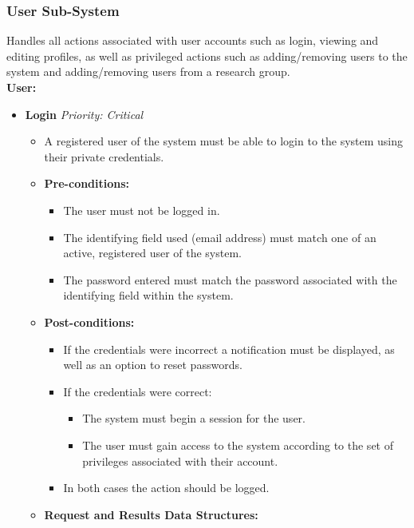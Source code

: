 \documentclass{article}
\begin{document}
			\subsubsection{User Sub-System}\label{subsubsec:user}
				Handles all actions associated with user accounts such as login, viewing and editing profiles, as well as privileged actions such as adding/removing users to the system and adding/removing users from a research group.\\
				[3mm]
				\textbf{User:}
				\begin{itemize}
					\item \textbf{Login} \hfill \textit{Priority: Critical}
					\begin{itemize}
						\item A registered user of the system must be able to login to the system using their private credentials.
						\item \textbf{Pre-conditions:}
						\begin{itemize}
							\item The user must not be logged in.
							\item The identifying field used (email address) must match one of an active, registered user of the system.
							\item The password entered must match the password associated with the identifying field within the system.
						\end{itemize}
						\item \textbf{Post-conditions:}
						\begin{itemize}
							\item If the credentials were incorrect a notification must be displayed, as well as an option to reset passwords.
							\item If the credentials were correct:
							\begin{itemize}
								\item The system must begin a session for the user.
								\item The user must gain access to the system according to the set of privileges associated with their account.
							\end{itemize}														
							\item In both cases the action should be logged.
						\end{itemize}
						\item \textbf{Request and Results Data Structures:}
					\end{itemize}
					

\end{itemize}
\end{document}
